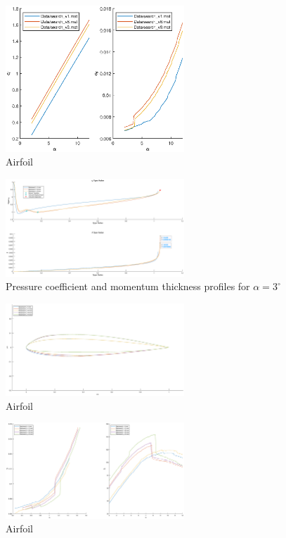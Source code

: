 \documentclass{article}
\begin{document}
\begin{figure}[H]
    \centering
    \includegraphics[width=0.6\textwidth]{figures/hiRe_lad_9.eps}
    \caption{Airfoil}
    \label{fig:airfoil}
\end{figure}
\begin{figure}[H]
    \centering
    \includegraphics[width=0.6\textwidth]{figures/hiRe_upperprofile_9_a3.eps}
    \caption{Pressure coefficient and momentum thickness profiles for $\alpha = 3^\circ$}
    \label{fig:airfoil}
\end{figure}
\begin{figure}[H]
    \centering
    \includegraphics[width=0.6\textwidth]{figures/hiRe_geometry_14.eps}
    \caption{Airfoil}
    \label{fig:airfoil}
\end{figure}
\begin{figure}[H]
    \centering
    \includegraphics[width=0.6\textwidth]{figures/hiRe_lod_14.eps}
    \caption{Airfoil}
    \label{fig:airfoil}
\end{figure}
\end{document}
